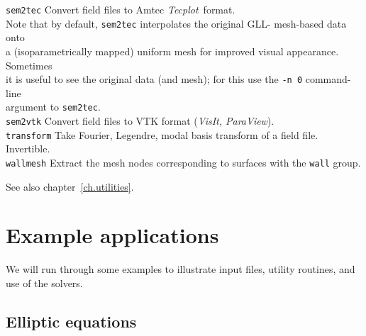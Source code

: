 \documentclass[11pt]{report}
\newcommand{\Tecplot}{\emph{Tecplot}}
\begin{document}
\begin{tabbing}
\texttt{sem2tec} \>   
        Convert field files to Amtec \Tecplot\ format.\\
        \> Note that by default, \verb|sem2tec| interpolates the original GLL-        mesh-based data onto \\
        \> a (isoparametrically mapped) uniform mesh for improved visual 
        appearance.  Sometimes\\ \>  it is useful to see the original data 
        (and mesh); for this use the \verb+-n 0+ command-line \\ 
         \> argument to \verb+sem2tec+.\\
\texttt{sem2vtk} \>   
        Convert field files to VTK format (\emph{VisIt, ParaView}).\\
\texttt{transform} \>      
        Take Fourier, Legendre, modal basis transform of a field
	file. Invertible.\\
\texttt{wallmesh} \>      
        Extract the mesh nodes corresponding to surfaces with the
	\verb+wall+ group.
\end{tabbing}
See also chapter~\ref{ch.utilities}.

\chapter{Example applications}
\label{ch.examples}

We will run through some examples to illustrate input files, utility
routines, and use of the solvers.

\section{Elliptic equations}
\label{sec.laplace}
\end{document}
